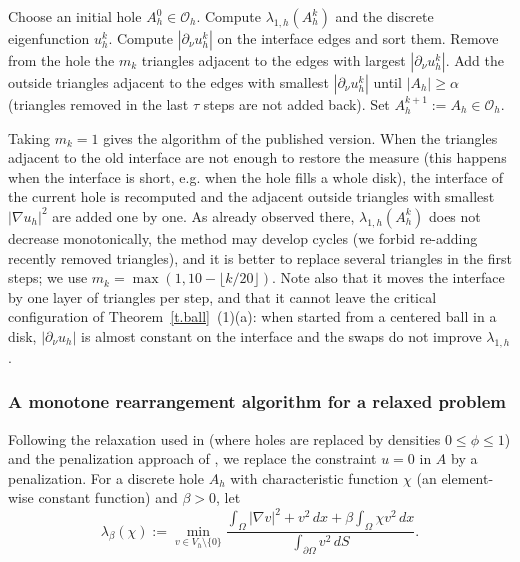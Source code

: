 \documentclass[11pt]{amsart}
\theoremstyle{remark}
\numberwithin{equation}{section}
\begin{document}
\begin{algorithm}[h]
\caption{Element swapping}\label{alg.swap}
\begin{algorithmic}[1]
\State Choose an initial hole $A^0_h\in\mathcal{O}_h$.
\State Compute $\lambda_{1,h}(A^k_h)$ and the discrete eigenfunction $u^k_h$.
\State Compute $|\partial_\nu u^k_h|$ on the interface edges and sort them.
\State Remove from the hole the $m_k$ triangles adjacent to the edges with largest $|\partial_\nu u^k_h|$.
\State Add the outside triangles adjacent to the edges with smallest $|\partial_\nu u^k_h|$ until $|A_h|\ge\alpha$ (triangles removed in the last $\tau$ steps are not added back).
\State Set $A^{k+1}_h:=A_h\in\mathcal{O}_h$.
\EndFor
\end{algorithmic}
\end{algorithm}

Taking $m_k=1$ gives the algorithm of the published version. When the triangles adjacent to the old interface are not enough to restore the measure (this happens when the interface is short, e.g. when the hole fills a whole disk), the interface of the current hole is recomputed and the adjacent outside triangles with smallest $|\nabla u_h|^2$ are added one by one. As already observed there, $\lambda_{1,h}(A^k_h)$ does not decrease monotonically, the method may develop cycles (we forbid re-adding recently removed triangles), and it is better to replace several triangles in the first steps; we use $m_k=\max(1,10-\lfloor k/20\rfloor)$. Note also that it moves the interface by one layer of triangles per step, and that it cannot leave the critical configuration of Theorem~\ref{t.ball}~(1)(a): when started from a centered ball in a disk, $|\partial_\nu u_h|$ is almost constant on the interface and the swaps do not improve $\lambda_{1,h}$.

\subsubsection{A monotone rearrangement algorithm for a relaxed problem}
Following the relaxation used in \cite{FBRW1} (where holes are replaced by densities $0\le\phi\le1$) and the penalization approach of \cite{FBRW2}, we replace the constraint $u=0$ in $A$ by a penalization. For a discrete hole $A_h$ with characteristic function $\chi$ (an element-wise constant function) and $\beta>0$, let
\[
\lambda_\beta(\chi):=\min_{v\in V_h\setminus\{0\}}\frac{\int_\Omega|\nabla v|^2+v^2\,dx+\beta\int_\Omega\chi v^2\,dx}{\int_{\partial\Omega}v^2\,dS}.
\]
\end{document}
